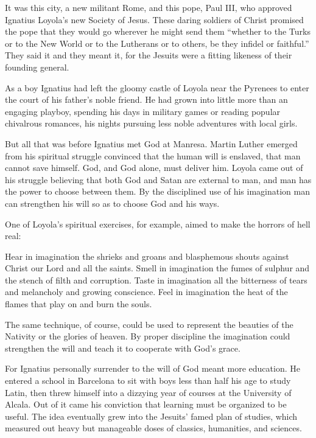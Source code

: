 It was this city, a new militant Rome, and this pope, Paul III, who approved Ignatius Loyola’s new
Society of Jesus. These daring soldiers of Christ promised the pope that they would go wherever he
might send them “whether to the Turks or to the New World or to the Lutherans or to others, be they
infidel or faithful.” They said it and they meant it, for the Jesuits were a fitting likeness of
their founding general.

As a boy Ignatius had left the gloomy castle of Loyola near the Pyrenees to enter the court of his
father’s noble friend. He had grown into little more than an engaging playboy, spending his days in
military games or reading popular chivalrous romances, his nights pursuing less noble adventures
with local girls.

But all that was before Ignatius met God at Manresa. Martin Luther emerged from his spiritual
struggle convinced that the human will is enslaved, that man cannot save himself. God, and God
alone, must deliver him. Loyola came out of his struggle believing that both God and Satan are
external to man, and man has the power to choose between them. By the disciplined use of his
imagination man can strengthen his will so as to choose God and his ways.

One of Loyola’s spiritual exercises, for example, aimed to make the horrors of hell real:

\begin{blockquote}
Hear in imagination the shrieks and groans and blasphemous shouts against Christ our Lord and all
the saints. Smell in imagination the fumes of sulphur and the stench of filth and corruption. Taste
in imagination all the bitterness of tears and melancholy and growing conscience. Feel in
imagination the heat of the flames that play on and burn the souls.
\end{blockquote}

\noindent The same technique, of course, could be used to represent the beauties of the Nativity or
the glories of heaven. By proper discipline the imagination could strengthen the will and teach it
to cooperate with God’s grace.

For Ignatius personally surrender to the will of God meant more education. He entered a school in
Barcelona to sit with boys less than half his age to study Latin, then threw himself into a dizzying
year of courses at the University of Alcala. Out of it came his conviction that learning must be
organized to be useful. The idea eventually grew into the Jesuits’ famed plan of studies, which
measured out heavy but manageable doses of classics, humanities, and sciences.

